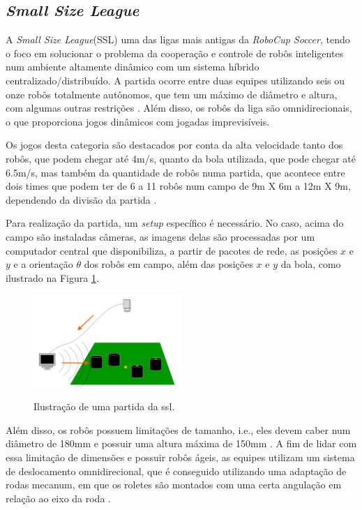\documentclass[acronym, symbols]{fei}
\begin{document}
	\subsection{\textit{Small Size League}}
	
		A \textit{Small Size League}(SSL) uma das ligas mais antigas da \textit{RoboCup Soccer}, tendo o foco em solucionar o problema da cooperação e controle de robôs inteligentes num ambiente altamente dinâmico com um sistema híbrido centralizado/distribuído. A partida ocorre entre duas equipes utilizando seis ou onze robôs totalmente autônomos, que tem um máximo de diâmetro e altura, com algumas outras restrições \cite{RoboCup}. Além disso, os robôs da liga são omnidirecionais, o que proporciona jogos dinâmicos com jogadas imprevisíveis.
		
		Os jogos desta categoria são destacados por conta da alta velocidade tanto dos robôs, que podem chegar até 4m/s, quanto da bola utilizada, que pode chegar até 6.5m/s, mas também da quantidade de robôs numa partida, que acontece entre dois times que podem ter de 6 a 11 robôs num campo de 9m X 6m a 12m X 9m, dependendo da divisão da partida \cite{10332958}.
		
		Para realização da partida, um \textit{setup} específico é necessário. No caso, acima do campo são instaladas câmeras, as imagens delas são processadas por um computador central que disponibiliza, a partir de pacotes de rede, as posições $x$ e $y$ e a orientação $\theta$ dos robôs em campo, além das posições $x$ e $y$ da bola, como ilustrado na Figura \ref{fig:ilustracao_partida_ssl}.
		
		\begin{figure}[!htb]
			\centering
			\caption{Ilustração de uma partida da \acrshort{ssl}.} 
			\includegraphics[width=0.5\textwidth]{funcionamento_ssl.png}
			\label{fig:ilustracao_partida_ssl}
		\end{figure}
		
		Além disso, os robôs possuem limitações de tamanho, i.e., eles devem caber num diâmetro de 180mm e possuir uma altura máxima de 150mm \cite{rules}. A fim de lidar com essa limitação de dimensões e possuir robôs ágeis, as equipes utilizam um sistema de deslocamento omnidirecional, que é conseguido utilizando uma adaptação de rodas mecanum, em que os roletes são montados com uma certa angulação em relação ao eixo da roda \cite{aguiarreformulaccao}.
		
\end{document}
